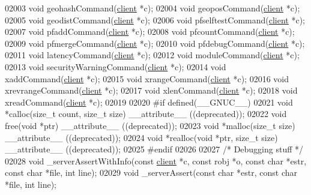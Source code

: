 \begin{DoxyCode}
{{{{{{{02003 \textcolor{keywordtype}{void} geohashCommand(\hyperlink{structclient}{client} *c);
02004 \textcolor{keywordtype}{void} geoposCommand(\hyperlink{structclient}{client} *c);
02005 \textcolor{keywordtype}{void} geodistCommand(\hyperlink{structclient}{client} *c);
02006 \textcolor{keywordtype}{void} pfselftestCommand(\hyperlink{structclient}{client} *c);
02007 \textcolor{keywordtype}{void} pfaddCommand(\hyperlink{structclient}{client} *c);
02008 \textcolor{keywordtype}{void} pfcountCommand(\hyperlink{structclient}{client} *c);
02009 \textcolor{keywordtype}{void} pfmergeCommand(\hyperlink{structclient}{client} *c);
02010 \textcolor{keywordtype}{void} pfdebugCommand(\hyperlink{structclient}{client} *c);
02011 \textcolor{keywordtype}{void} latencyCommand(\hyperlink{structclient}{client} *c);
02012 \textcolor{keywordtype}{void} moduleCommand(\hyperlink{structclient}{client} *c);
02013 \textcolor{keywordtype}{void} securityWarningCommand(\hyperlink{structclient}{client} *c);
02014 \textcolor{keywordtype}{void} xaddCommand(\hyperlink{structclient}{client} *c);
02015 \textcolor{keywordtype}{void} xrangeCommand(\hyperlink{structclient}{client} *c);
02016 \textcolor{keywordtype}{void} xrevrangeCommand(\hyperlink{structclient}{client} *c);
02017 \textcolor{keywordtype}{void} xlenCommand(\hyperlink{structclient}{client} *c);
02018 \textcolor{keywordtype}{void} xreadCommand(\hyperlink{structclient}{client} *c);
02019 
02020 \textcolor{preprocessor}{#}\textcolor{preprocessor}{if} \textcolor{preprocessor}{defined}\textcolor{preprocessor}{(}\_\_GNUC\_\_\textcolor{preprocessor}{)}
02021 \textcolor{keywordtype}{void} *calloc(size\_t count, size\_t size) \textcolor{keyword}{\_\_attribute\_\_} ((deprecated));
02022 \textcolor{keywordtype}{void} free(\textcolor{keywordtype}{void} *ptr) \textcolor{keyword}{\_\_attribute\_\_} ((deprecated));
02023 \textcolor{keywordtype}{void} *malloc(size\_t size) \textcolor{keyword}{\_\_attribute\_\_} ((deprecated));
02024 \textcolor{keywordtype}{void} *realloc(\textcolor{keywordtype}{void} *ptr, size\_t size) \textcolor{keyword}{\_\_attribute\_\_} ((deprecated));
02025 \textcolor{preprocessor}{#}\textcolor{preprocessor}{endif}
02026 
02027 \textcolor{comment}{/* Debugging stuff */}
02028 \textcolor{keywordtype}{void} \_serverAssertWithInfo(\textcolor{keyword}{const} \hyperlink{structclient}{client} *c, \textcolor{keyword}{const} robj *o, \textcolor{keyword}{const} \textcolor{keywordtype}{char} *estr, \textcolor{keyword}{const} \textcolor{keywordtype}{char} *file, \textcolor{keywordtype}{
      int} line);
02029 \textcolor{keywordtype}{void} \_serverAssert(\textcolor{keyword}{const} \textcolor{keywordtype}{char} *estr, \textcolor{keyword}{const} \textcolor{keywordtype}{char} *file, \textcolor{keywordtype}{int} line);
}}}}}}}
\end{DoxyCode}
